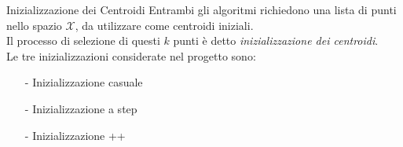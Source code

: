 \documentclass{beamer}
\begin{document}

\begin{frame}{Inizializzazione dei Centroidi}
    Entrambi gli algoritmi richiedono una lista di punti nello spazio $\mathcal{X}$, da utilizzare come centroidi iniziali.\\[.5cm]
    \pause
    Il processo di selezione di questi $k$ punti è detto \emph{inizializzazione dei centroidi}.\\[.5cm]
    Le tre inizializzazioni considerate nel progetto sono:\\[.5cm]
    \begin{itemize}
        \item[-] Inizializzazione casuale
        \item[-] Inizializzazione a step
        \item[-] Inizializzazione ++
    \end{itemize}
\end{frame}
\end{document}
